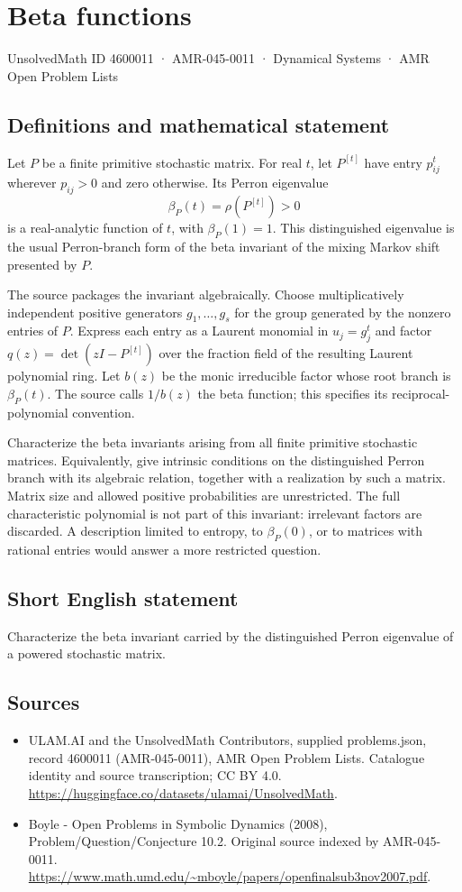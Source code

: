 \documentclass[11pt,a4paper]{article}
\begin{document}
\section*{Beta functions}\label{4600011}
{\small UnsolvedMath ID 4600011 · AMR-045-0011 · Dynamical Systems · AMR Open Problem Lists}
\subsection{Definitions and mathematical statement}
Let $P$ be a finite primitive stochastic matrix. For real $t$, let
$P^{[t]}$ have entry $p_{ij}^t$ wherever $p_{ij}>0$ and zero otherwise.
Its Perron eigenvalue
\[
 \beta_P(t)=\rho(P^{[t]})>0
\]
is a real-analytic function of $t$, with $\beta_P(1)=1$.
This distinguished eigenvalue is the usual Perron-branch form of the
beta invariant of the mixing Markov shift presented by $P$.

The source packages the invariant algebraically. Choose multiplicatively
independent positive generators $g_1,\ldots,g_s$ for the group generated
by the nonzero entries of $P$. Express each entry as a Laurent monomial
in $u_j=g_j^t$ and factor
$q(z)=\det(zI-P^{[t]})$ over the fraction field of the resulting Laurent
polynomial ring. Let $b(z)$ be the monic irreducible factor whose root
branch is $\beta_P(t)$. The source calls $1/b(z)$ the beta function;
this specifies its reciprocal-polynomial convention.

Characterize the beta invariants arising from all finite primitive
stochastic matrices. Equivalently, give intrinsic conditions on the
distinguished Perron branch with its algebraic relation, together with
a realization by such a matrix. Matrix size and allowed positive
probabilities are unrestricted. The full characteristic polynomial is
not part of this invariant: irrelevant factors are discarded. A
description limited to entropy, to $\beta_P(0)$, or to matrices with
rational entries would answer a more restricted question.
\subsection{Short English statement}
Characterize the beta invariant carried by the distinguished Perron eigenvalue of a powered stochastic matrix.
\subsection{Sources}
\begin{itemize}
\item[S1] ULAM.AI and the UnsolvedMath Contributors, supplied problems.json, record 4600011 (AMR-045-0011), AMR Open Problem Lists. Catalogue identity and source transcription; CC BY 4.0.
\url{https://huggingface.co/datasets/ulamai/UnsolvedMath}.
\item[S2] Boyle - Open Problems in Symbolic Dynamics (2008), Problem/Question/Conjecture 10.2. Original source indexed by AMR-045-0011.
\url{https://www.math.umd.edu/~mboyle/papers/openfinalsub3nov2007.pdf}.
\end{itemize}
\end{document}
